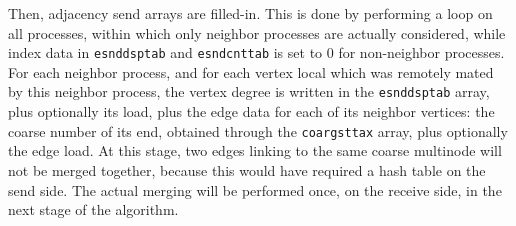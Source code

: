 Then, adjacency send arrays are filled-in. This is done by performing
a loop on all processes, within which only neighbor processes are
actually considered, while index data in \texttt{esnddsptab} and
\texttt{esndcnttab} is set to $0$ for non-neighbor processes. For each
neighbor process, and for each vertex local which was remotely mated
by this neighbor process, the vertex degree is written in the
\texttt{esnddsptab} array, plus optionally its load, plus the edge
data for each of its neighbor vertices: the coarse number of its end,
obtained through the \texttt{coargsttax} array, plus optionally the
edge load. At this stage, two edges linking to the same coarse
multinode will not be merged together, because this would have
required a hash table on the send side. The actual merging will be
performed once, on the receive side, in the next stage of the
algorithm.
